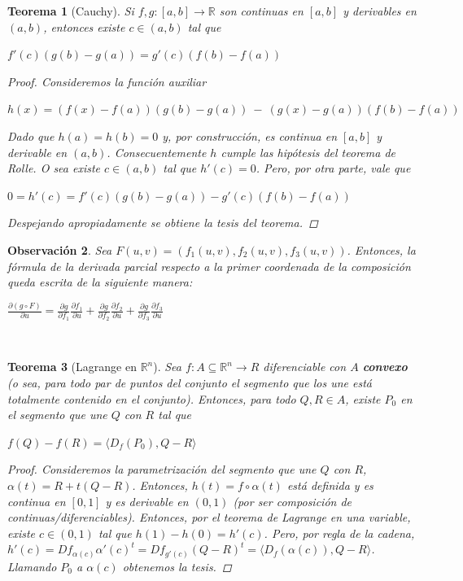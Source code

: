 \documentclass[]{article}
\newtheorem{teo}{Teorema}
\newtheorem{obs}[teo]{Observación}
\def\R{\mathbb{R}}
\newcommand{\ip}[2]{\langle #1,#2 \rangle}
\begin{document}
\begin{teo}[Cauchy]
	Si $f,g:[a,b]\to \R$ son continuas en $[a,b]$ y derivables en $(a,b)$, entonces existe $c\in (a,b)$ tal que 
	\begin{center}
		$f'(c)(g(b)-g(a)) = g'(c)(f(b)-f(a))$
	\end{center}
	\begin{proof}
		Consideremos la función auxiliar 
		\begin{center}
			$h(x) = (f(x)-f(a))(g(b)-g(a))\ -\ (g(x)-g(a))(f(b)-f(a))$
		\end{center}
		Dado que $h(a)=h(b)=0$ y, por construcción, es continua en $[a,b]$ y derivable en $(a,b)$. Consecuentemente $h$ cumple las hipótesis del teorema de Rolle. O sea existe $c\in (a,b)$ tal que $h'(c) = 0$. Pero, por otra parte, vale que
		\begin{center}
			$0 = h'(c) = f'(c)(g(b)-g(a)) - g'(c)(f(b)-f(a))$
		\end{center}
		Despejando apropiadamente se obtiene la tesis del teorema.
	\end{proof}
\end{teo}

\begin{obs}
	Sea $F(u,v) = (f_1(u,v),f_2(u,v),f_3(u,v))$. Entonces, la fórmula de la derivada parcial respecto a la primer coordenada de la composición queda escrita de la siguiente manera:
	\begin{center}
		$\displaystyle \frac{\partial (g \circ F)}{\partial u} = \frac{\partial g}{\partial f_1}\frac{\partial f_1}{\partial u} + \frac{\partial g}{\partial f_2}\frac{\partial f_2}{\partial u} + \frac{\partial g}{\partial f_3}\frac{\partial f_3}{\partial u}$
	\end{center}
\end{obs}
~\newline

\begin{teo}[Lagrange en $\R^n$]
	Sea $f:A\subseteq \R^n\to R$ diferenciable con $A$ \textbf{convexo} (o sea, para todo par de puntos del conjunto el segmento que los une está totalmente contenido en el conjunto). Entonces, para todo $Q,R\in A$, existe $P_0$ en el segmento que une $Q$ con $R$ tal que
	\begin{center}
		$f(Q)-f(R) = \ip{D_f(P_0)}{Q-R}$
	\end{center}
	\begin{proof}
		Consideremos la parametrización del segmento que une $Q$ con $R$, $\alpha(t) = R+t(Q-R)$. Entonces, $h(t) = f \circ \alpha(t)$ está definida y es continua en $[0,1]$ y es derivable en $(0,1)$ (por ser composición de continuas/diferenciables). Entonces, por el teorema de \textit{Lagrange} en una variable, existe $c\in (0,1)$ tal que $h(1) - h(0) = h'(c)$. Pero, por regla de la cadena, $h'(c) = Df_{\alpha(c)}\alpha'(c)^t = Df_{g'(c)}(Q-R)^t = \ip{D_f(\alpha(c))}{Q-R}$. Llamando $P_0$ a $\alpha(c)$ obtenemos la tesis.
	\end{proof}
\end{teo}
\end{document}
